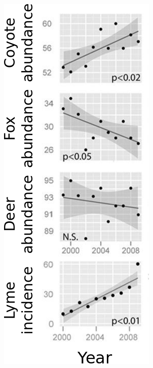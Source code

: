 \begin{frame}[t]
\begin{adjustwidth}{-2em}{-1.5em}
\begin{columns}[t]
            \vspace{-3mm}
            \includegraphics[width=\columnwidth]{lyme-dz.png}

        \end{columns}

        \vspace{-4mm}
    \end{adjustwidth}
\end{frame}



